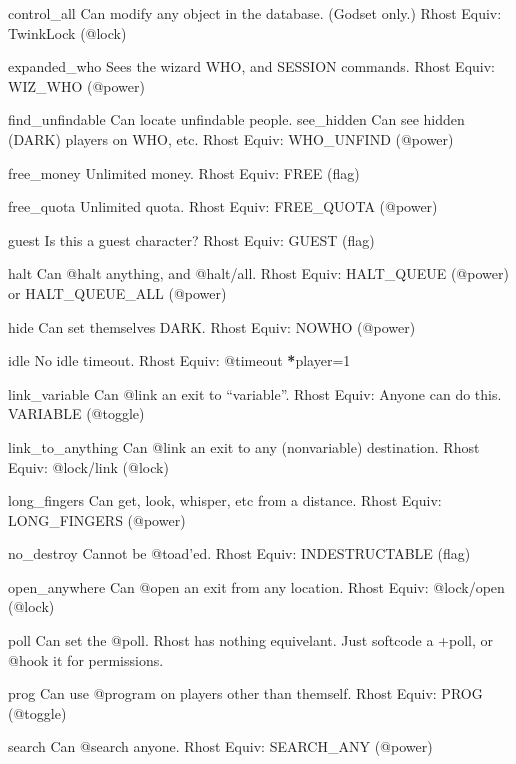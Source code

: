 \documentclass[letterpaper,10pt,english]{sphinxmanual}
\begin{document}
\sphinxAtStartPar
control\_all           Can modify any object in the database. (God\sphinxhyphen{}set only.)
Rhost Equiv: TwinkLock (@lock)

\sphinxAtStartPar
expanded\_who          Sees the wizard WHO, and SESSION commands.
Rhost Equiv: WIZ\_WHO (@power)

\sphinxAtStartPar
find\_unfindable       Can locate unfindable people.
see\_hidden            Can see hidden (DARK) players on WHO, etc.
Rhost Equiv: WHO\_UNFIND (@power)

\sphinxAtStartPar
free\_money            Unlimited money.
Rhost Equiv: FREE (flag)

\sphinxAtStartPar
free\_quota            Unlimited quota.
Rhost Equiv: FREE\_QUOTA (@power)

\sphinxAtStartPar
guest                 Is this a guest character?
Rhost Equiv: GUEST (flag)

\sphinxAtStartPar
halt                  Can @halt anything, and @halt/all.
Rhost Equiv: HALT\_QUEUE (@power) or HALT\_QUEUE\_ALL (@power)

\sphinxAtStartPar
hide                  Can set themselves DARK.
Rhost Equiv: NOWHO (@power)

\sphinxAtStartPar
idle                  No idle timeout.
Rhost Equiv: @timeout {\color{red}\bfseries{}*}player=\sphinxhyphen{}1

\sphinxAtStartPar
link\_variable         Can @link an exit to “variable”.
Rhost Equiv: Anyone can do this.  VARIABLE (@toggle)

\sphinxAtStartPar
link\_to\_anything      Can @link an exit to any (non\sphinxhyphen{}variable) destination.
Rhost Equiv: @lock/link (@lock)

\sphinxAtStartPar
long\_fingers          Can get, look, whisper, etc from a distance.
Rhost Equiv: LONG\_FINGERS (@power)

\sphinxAtStartPar
no\_destroy            Cannot be @toad’ed.
Rhost Equiv: INDESTRUCTABLE (flag)

\sphinxAtStartPar
open\_anywhere         Can @open an exit from any location.
Rhost Equiv: @lock/open (@lock)

\sphinxAtStartPar
poll                  Can set the @poll.
Rhost has nothing equivelant.  Just softcode a +poll, or @hook it for permissions.

\sphinxAtStartPar
prog                  Can use @program on players other than themself.
Rhost Equiv: PROG (@toggle)

\sphinxAtStartPar
search                Can @search anyone.
Rhost Equiv: SEARCH\_ANY (@power)
\end{document}

